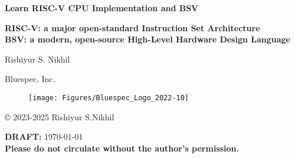 
\pagestyle{empty}

\begin{center}

\vspace*{1.5in}

{\LARGE\bf Learn RISC-V CPU Implementation and BSV}

\vspace{1ex}

{\large\bf RISC-V: a major open-standard Instruction Set Architecture} \\
{\large\bf BSV: a modern, open-source High-Level Hardware Design Language}

\vspace{2cm}

{\Large Rishiyur S. Nikhil}

Bluespec, Inc.

\vspace*{0.5in}

\begin{figure}[htbp]
  \centerline{\texttt{[image: Figures/Bluespec\_Logo\_2022-10]}}
\end{figure}

\vfill

\copyright{} 2023-2025 Rishiyur S.Nikhil

\vspace{0.5in}

{\bf DRAFT:} \today \\
{\bf Please do not circulate without the author's permission.}

\end{center}






\vspace*{2in}


% 


\newpage


